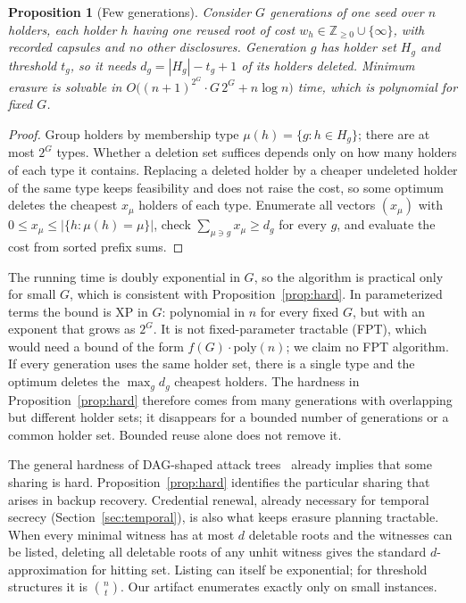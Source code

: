 \documentclass[pdflatex,sn-mathphys-num,twocolumn]{sn-jnl}
\theoremstyle{plain}
\newtheorem{proposition}[theorem]{Proposition}
\theoremstyle{definition}
\begin{document}
\begin{proposition}[Few generations]\label{prop:fewgen}
Consider $G$ generations of one seed over $n$ holders, each holder $h$ having one reused root of cost $w_h\in\mathbb{Z}_{\ge0}\cup\{\infty\}$, with recorded capsules and no other disclosures. Generation $g$ has holder set $H_g$ and threshold $t_g$, so it needs $d_g=|H_g|-t_g+1$ of its holders deleted. Minimum erasure is solvable in $O\big((n+1)^{2^G}\cdot G\,2^G+n\log n\big)$ time, which is polynomial for fixed $G$.
\end{proposition}
\begin{proof}
Group holders by membership type $\mu(h)=\{g:h\in H_g\}$; there are at most $2^G$ types. Whether a deletion set suffices depends only on how many holders of each type it contains. Replacing a deleted holder by a cheaper undeleted holder of the same type keeps feasibility and does not raise the cost, so some optimum deletes the cheapest $x_\mu$ holders of each type. Enumerate all vectors $(x_\mu)$ with $0\le x_\mu\le|\{h:\mu(h)=\mu\}|$, check $\sum_{\mu\ni g}x_\mu\ge d_g$ for every $g$, and evaluate the cost from sorted prefix sums.
\end{proof}

The running time is doubly exponential in $G$, so the algorithm is practical only for small $G$, which is consistent with Proposition~\ref{prop:hard}. In parameterized terms the bound is XP in $G$: polynomial in $n$ for every fixed $G$, but with an exponent that grows as $2^G$. It is not fixed-parameter tractable (FPT), which would need a bound of the form $f(G)\cdot\mathrm{poly}(n)$; we claim no FPT algorithm. If every generation uses the same holder set, there is a single type and the optimum deletes the $\max_gd_g$ cheapest holders. The hardness in Proposition~\ref{prop:hard} therefore comes from many generations with overlapping but different holder sets; it disappears for a bounded number of generations or a common holder set. Bounded reuse alone does not remove it.

The general hardness of DAG-shaped attack trees~\cite{lopuhaa2022} already implies that some sharing is hard. Proposition~\ref{prop:hard} identifies the particular sharing that arises in backup recovery. Credential renewal, already necessary for temporal secrecy (Section~\ref{sec:temporal}), is also what keeps erasure planning tractable. When every minimal witness has at most $d$ deletable roots and the witnesses can be listed, deleting all deletable roots of any unhit witness gives the standard $d$-approximation for hitting set. Listing can itself be exponential; for threshold structures it is $\binom{n}{t}$. Our artifact enumerates exactly only on small instances.
\end{document}
